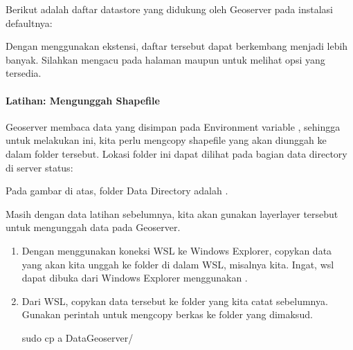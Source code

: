 \documentclass[letterpaper,10pt,english]{sphinxmanual}
\begin{document}
Berikut adalah daftar datastore yang didukung oleh Geoserver pada instalasi defaultnya:


Dengan menggunakan ekstensi, daftar tersebut dapat berkembang menjadi lebih banyak. Silahkan mengacu pada halaman  maupun  untuk melihat opsi yang tersedia.


\paragraph{Latihan: Mengunggah Shapefile}
\label{\detokenize{sesi3/publikasi:latihan-mengunggah-shapefile}}
Geoserver membaca data yang disimpan pada Environment variable , sehingga untuk melakukan ini, kita perlu mengcopy shapefile yang akan diunggah ke dalam folder tersebut. Lokasi folder ini dapat dilihat pada bagian data directory di server status:


Pada gambar di atas, folder Data Directory adalah .

Masih dengan data latihan sebelumnya, kita akan gunakan layer\sphinxhyphen{}layer tersebut untuk mengunggah data pada Geoserver.
\begin{enumerate}
%
\item {} 
Dengan menggunakan koneksi WSL ke Windows Explorer, copykan data yang akan kita unggah ke folder di dalam WSL, misalnya  kita. Ingat, wsl dapat dibuka dari Windows Explorer menggunakan .


\item {} 
Dari WSL, copykan data tersebut ke folder  yang kita catat sebelumnya. Gunakan perintah  untuk mengcopy berkas ke folder yang dimaksud.

\begin{sphinxVerbatim}[commandchars=\\\{\}]
sudo cp \PYGZhy{}a Data\PYGZus{}Geoserver/  
\end{sphinxVerbatim}

\end{enumerate}
\end{document}
